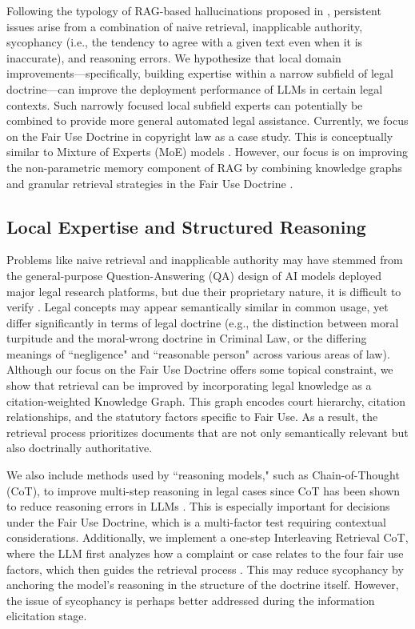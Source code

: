 Following the typology of RAG-based hallucinations proposed in \cite{04b_HallucinationFree}, persistent issues arise from a combination of naive retrieval, inapplicable authority, sycophancy (i.e., the tendency to agree with a given text even when it is inaccurate), and reasoning errors. We hypothesize that local domain improvements—specifically, building expertise within a narrow subfield of legal doctrine—can improve the deployment performance of LLMs in certain legal contexts. Such narrowly focused local subfield experts can potentially be combined to provide more general automated legal assistance. Currently, we focus on the Fair Use Doctrine in copyright law as a case study.  This is conceptually similar to Mixture of Experts (MoE) models \cite{13_AdaptiveMoE}. However, our focus is on improving the non-parametric memory component of RAG by combining knowledge graphs and granular retrieval strategies in the Fair Use Doctrine \cite{23_NonParametricRAGContinualLearning, 01_UnifyingKGwithLLM, 03b_SemanticRepresentationContextual, 02_DenseRetrieval}.

\subsection{Local Expertise and Structured Reasoning}

Problems like naive retrieval and inapplicable authority may have stemmed from the general-purpose Question-Answering (QA) design of AI models deployed major legal research platforms, but due their proprietary nature, it is difficult to verify \cite{04b_HallucinationFree}. Legal concepts may appear semantically similar in common usage, yet differ significantly in terms of legal doctrine (e.g., the distinction between moral turpitude and the moral-wrong doctrine in Criminal Law, or the differing meanings of ``negligence" and ``reasonable person" across various areas of law). Although our focus on the Fair Use Doctrine offers some topical constraint, we show that retrieval can be improved by incorporating legal knowledge as a citation-weighted Knowledge Graph. This graph encodes court hierarchy, citation relationships, and the statutory factors specific to Fair Use. As a result, the retrieval process prioritizes documents that are not only semantically relevant but also doctrinally authoritative.

We also include methods used by ``reasoning models," such as Chain-of-Thought (CoT), to improve multi-step reasoning in legal cases since CoT has been shown to reduce reasoning errors in LLMs \cite{08_CoT}. This is especially important for decisions under the Fair Use Doctrine, which is a multi-factor test requiring contextual considerations. Additionally, we implement a one-step Interleaving Retrieval CoT, where the LLM first analyzes how a complaint or case relates to the four fair use factors, which then guides the retrieval process \cite{28_CoTandIRCoT}. This may reduce sycophancy by anchoring the model’s reasoning in the structure of the doctrine itself. However, the issue of sycophancy is perhaps better addressed during the information elicitation stage.

